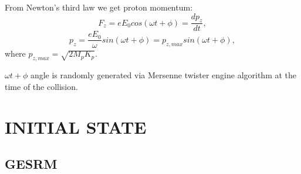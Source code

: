 \documentclass[12pt]{report}
\begin{document}
From Newton's third law we get proton momentum:
\begin{equation}
F_z = e E_0cos(\omega t + \phi) = \frac{dp_z}{dt},
\end{equation}
\begin{equation}
p_z = \frac{eE_0}{\omega} sin(\omega t + \phi) = p_{z,max} sin(\omega t + \phi),
\end{equation}
where $p_{z,max} = \sqrt{2M_pK_p}$.

$\omega t + \phi$ angle is randomly generated  via Mersenne twister engine algorithm at the time of the collision.


\section{INITIAL STATE}

\subsection{GESRM}



\end{document}
